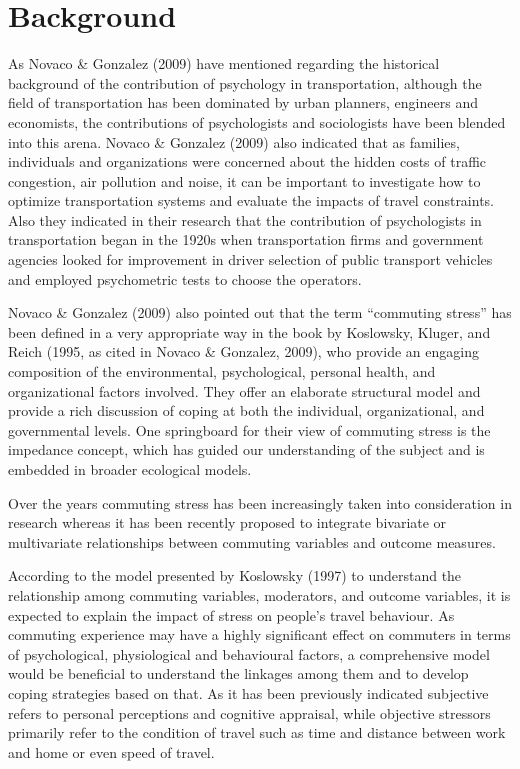 \documentclass[
11pt, %
oneside, %
english, %
singlespacing, %
]{macthesis} %
\begin{document}
\hypertarget{background}{%
\section{Background}\label{background}}

As Novaco \& Gonzalez (2009) have mentioned regarding the historical background of the contribution of psychology in transportation, although the field of transportation has been dominated by urban planners, engineers and economists, the contributions of psychologists and sociologists have been blended into this arena. Novaco \& Gonzalez (2009) also indicated that as families, individuals and organizations were concerned about the hidden costs of traffic congestion, air pollution and noise, it can be important to investigate how to optimize transportation systems and evaluate the impacts of travel constraints. Also they indicated in their research that the contribution of psychologists in transportation began in the 1920s when transportation firms and government agencies looked for improvement in driver selection of public transport vehicles and employed psychometric tests to choose the operators.

Novaco \& Gonzalez (2009) also pointed out that the term ``commuting stress'' has been defined in a very appropriate way in the book by Koslowsky, Kluger, and Reich (1995, as cited in Novaco \& Gonzalez, 2009), who provide an engaging composition of the environmental, psychological, personal health, and organizational factors involved. They offer an elaborate structural model and provide a rich discussion of coping at both the individual, organizational, and governmental levels. One springboard for their view of commuting stress is the impedance concept, which has guided our understanding of the subject and is embedded in broader ecological models.

Over the years commuting stress has been increasingly taken into consideration in research whereas it has been recently proposed to integrate bivariate or multivariate relationships between commuting variables and outcome measures.

According to the model presented by Koslowsky (1997) to understand the relationship among commuting variables, moderators, and outcome variables, it is expected to explain the impact of stress on people's travel behaviour. As commuting experience may have a highly significant effect on commuters in terms of psychological, physiological and behavioural factors, a comprehensive model would be beneficial to understand the linkages among them and to develop coping strategies based on that. As it has been previously indicated subjective refers to personal perceptions and cognitive appraisal, while objective stressors primarily refer to the condition of travel such as time and distance between work and home or even speed of travel.
\end{document}
